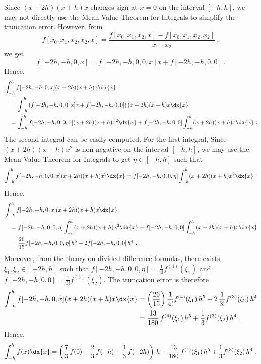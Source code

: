 {Since $(x+2h)(x+h)x$ changes sign at $x=0$ on the interval $[-h,h]$, we
may not directly use the Mean Value Theorem for Integrals to simplify
the truncation error.  However, from
\[
f[x_0,x_1,x_2,x_2,x] = \frac{f[x_0,x_1,x_2,x] - f[x_0,x_1,x_2,x_2]}{x-x_2} \ ,
\]
we get
\[
f[-2h,-h,0,x] = f[-2h,-h,0,0,x] x + f[-2h,-h,0,0] \ .
\]
Hence,
\begin{align*}
&\int_{-h}^h f[-2h,-h,0,x] (x+2h)(x+h)x \dx{x} \\
&\quad = \int_{-h}^h
\left( f[-2h,-h,0,0,x] x + f[-2h,-h,0,0] \right)
(x+2h)(x+h)x \dx{x} \\
&\quad = \int_{-h}^h f[-2h,-h,0,0,x] (x+2h)(x+h)x^2 \dx{x}
+f[-2h,-h,0,0] \int_{-h}^h (x+2h)(x+h)x \dx{x} \ .
\end{align*}
The second integral can be easily computed.  For the first integral,
Since $\displaystyle (x+2h)(x+h)x^2$ is non-negative on the interval
$[-h,h]$, we may use the Mean Value Theorem for Integrals to get $\eta
\in [-h,h]$ such that
\[
\int_{-h}^h f[-2h,-h,0,0,x] (x+2h)(x+h)x^2 \dx{x}
= f[-2h,-h,0,0,\eta] \int_{-h}^h(x+2h)(x+h)x^2 \dx{x} \ .
\]
Hence,
\begin{align*}
&\int_{-h}^h f[-2h,-h,0,x] (x+2h)(x+h)x \dx{x} \\
&\quad = f[-2h,-h,0,0,\eta] \int_{-h}^h (x+2h)(x+h)x^2 \dx{x}
 + f[-2h,-h,0,0] \int_{-h}^h (x+2h)(x+h)x \dx{x} \\
&\quad = \frac{26}{15} f[-2h,-h,0,0,\eta]\,h^5 + 2 f[-2h,-h,0,0]\,h^4 \ .
\end{align*}
Moreover, from the theory on divided difference formulas, there exists
$\xi_1, \xi_2 \in [-2h,h]$ such that
$\displaystyle f[-2h,-h,0,0,\eta] = \frac{1}{4!} f^{(4)}(\xi_1)$
and
$\displaystyle f[-2h,-h,0,0] = \frac{1}{3!} f^{(3)}(\xi_2)$.
The truncation error is therefore
\begin{align*}
\int_{-h}^h f[-2h,-h,0,x] (x+2h)(x+h)x \dx{x} 
&= \left(\frac{26}{15}\right) \frac{1}{4!} f^{(4)}(\xi_1)\, h^5
+ 2 \,\frac{1}{3!} f^{(3)}(\xi_2)\, h^4 \\
&= \frac{13}{180} \, f^{(4)}(\xi_1)\,h^5 + \frac{1}{3} f^{(3)}(\xi_2)\,h^4 \ .
\end{align*}
Hence,
\begin{equation}\label{Questformula1}
\int_{-h}^h f(x) \dx{x}
= \left(\frac{7}{3}\,f(0) - \frac{2}{3}\,f(-h) +
\frac{1}{3}\,f(-2h)\right)\,h
+ \frac{13}{180} \, f^{(4)}(\xi_1)\,h^5 + \frac{1}{3} f^{(3)}(\xi_2)\,h^4 \ .
\end{equation}

}
